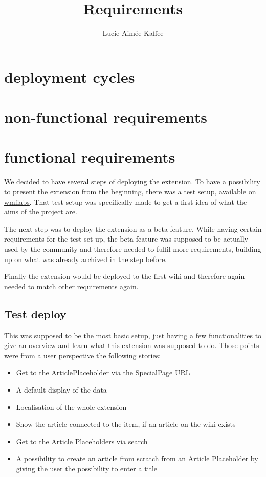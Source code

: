 \documentclass[11pt]{article}
\title {{Requirements}}
\author {Lucie-Aim\'{e}e Kaffee}
\date{}
\begin{document}
\maketitle

\section{deployment cycles}
\section{non-functional requirements}
\section{functional requirements}

We decided to have several steps of deploying the extension. 
To have a possibility to present the extension from the beginning, there was a test setup, available on \href{articleplaceholder.wmflabs.org/mediawiki}{wmflabs}. That test setup was specifically made to get a first idea of what the aims of the project are. 

The next step was to deploy the extension as a beta feature. While having certain requirements for the test set up, the beta feature was supposed to be actually used by the community and therefore needed to fulfil more requirements, building up on what was already archived in the step before.

Finally the extension would be deployed to the first wiki and therefore again needed to match other requirements again. 

\subsection{Test deploy}

This was supposed to be the most basic setup, just having a few functionalities to give an overview and learn what this extension was supposed to do. 
Those points were from a user perspective the following stories:
\begin{itemize}
\item Get to the ArticlePlaceholder via the SpecialPage URL
\item A default display of the data
\item Localisation of the whole extension
\item Show the article connected to the item, if an article on the wiki exists
\item Get to the Article Placeholders via search
\item A possibility to create an article from scratch from an Article Placeholder by giving the user the possibility to enter a title
\end{itemize}
\end{document}
